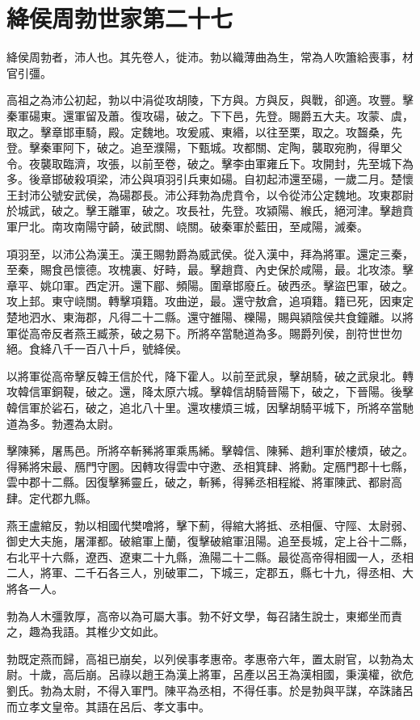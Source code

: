 \chapter{絳侯周勃世家第二十七}

絳侯周勃者，沛人也。其先卷人，徙沛。勃以織薄曲為生，常為人吹簫給喪事，材官引彊。

高祖之為沛公初起，勃以中涓從攻胡陵，下方與。方與反，與戰，卻適。攻豐。擊秦軍碭東。還軍留及蕭。復攻碭，破之。下下邑，先登。賜爵五大夫。攻蒙、虞，取之。擊章邯車騎，殿。定魏地。攻爰戚、東緡，以往至栗，取之。攻齧桑，先登。擊秦軍阿下，破之。追至濮陽，下甄城。攻都關、定陶，襲取宛朐，得單父令。夜襲取臨濟，攻張，以前至卷，破之。擊李由軍雍丘下。攻開封，先至城下為多。後章邯破殺項梁，沛公與項羽引兵東如碭。自初起沛還至碭，一歲二月。楚懷王封沛公號安武侯，為碭郡長。沛公拜勃為虎賁令，以令從沛公定魏地。攻東郡尉於城武，破之。擊王離軍，破之。攻長社，先登。攻潁陽、緱氏，絕河津。擊趙賁軍尸北。南攻南陽守齮，破武關、峣關。破秦軍於藍田，至咸陽，滅秦。

項羽至，以沛公為漢王。漢王賜勃爵為威武侯。從入漢中，拜為將軍。還定三秦，至秦，賜食邑懷德。攻槐裏、好畤，最。擊趙賁、內史保於咸陽，最。北攻漆。擊章平、姚卬軍。西定汧。還下郿、頻陽。圍章邯廢丘。破西丞。擊盜巴軍，破之。攻上邽。東守峣關。轉擊項籍。攻曲逆，最。還守敖倉，追項籍。籍已死，因東定楚地泗水、東海郡，凡得二十二縣。還守雒陽、櫟陽，賜與潁陰侯共食鐘離。以將軍從高帝反者燕王臧荼，破之易下。所將卒當馳道為多。賜爵列侯，剖符世世勿絕。食絳八千一百八十戶，號絳侯。

以將軍從高帝擊反韓王信於代，降下霍人。以前至武泉，擊胡騎，破之武泉北。轉攻韓信軍銅鞮，破之。還，降太原六城。擊韓信胡騎晉陽下，破之，下晉陽。後擊韓信軍於硰石，破之，追北八十里。還攻樓煩三城，因擊胡騎平城下，所將卒當馳道為多。勃遷為太尉。

擊陳豨，屠馬邑。所將卒斬豨將軍乘馬絺。擊韓信、陳豨、趙利軍於樓煩，破之。得豨將宋最、鴈門守圂。因轉攻得雲中守遬、丞相箕肆、將勳。定鴈門郡十七縣，雲中郡十二縣。因復擊豨靈丘，破之，斬豨，得豨丞相程縱、將軍陳武、都尉高肆。定代郡九縣。

燕王盧綰反，勃以相國代樊噲將，擊下薊，得綰大將抵、丞相偃、守陘、太尉弱、御史大夫施，屠渾都。破綰軍上蘭，復擊破綰軍沮陽。追至長城，定上谷十二縣，右北平十六縣，遼西、遼東二十九縣，漁陽二十二縣。最從高帝得相國一人，丞相二人，將軍、二千石各三人，別破軍二，下城三，定郡五，縣七十九，得丞相、大將各一人。

勃為人木彊敦厚，高帝以為可屬大事。勃不好文學，每召諸生說士，東鄉坐而責之，趣為我語。其椎少文如此。

勃既定燕而歸，高祖已崩矣，以列侯事孝惠帝。孝惠帝六年，置太尉官，以勃為太尉。十歲，高后崩。呂祿以趙王為漢上將軍，呂產以呂王為漢相國，秉漢權，欲危劉氏。勃為太尉，不得入軍門。陳平為丞相，不得任事。於是勃與平謀，卒誅諸呂而立孝文皇帝。其語在呂后、孝文事中。

